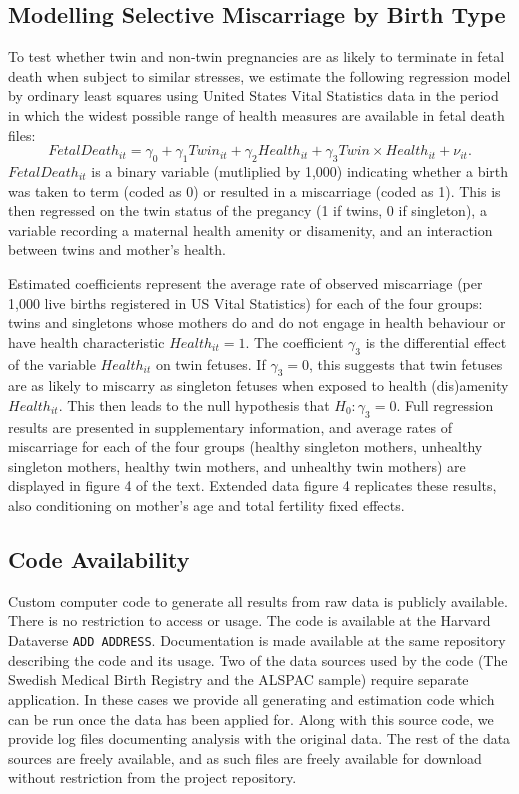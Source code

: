 \documentclass{nature}
\begin{document}
\begin{linenumbers}
\subsection{Modelling Selective Miscarriage by Birth Type}
To test whether twin and non-twin pregnancies are as likely to terminate in fetal death when subject to similar stresses, we estimate the following regression model by ordinary least squares using United States Vital Statistics data in the period in which the widest possible range of health measures are available in fetal death files:
\begin{equation}
FetalDeath_{it} = \gamma_0 + \gamma_1 Twin_{it} + \gamma_2 Health_{it} + \gamma_3 Twin\times Health_{it} + \nu_{it}.
\end{equation}
$FetalDeath_{it}$ is a binary variable (mutliplied by 1,000) indicating whether a birth was taken to term (coded as 0) or resulted in a miscarriage (coded as 1).  This is then regressed on the twin status of the pregancy (1 if twins, 0 if singleton), a variable recording a maternal health amenity or disamenity, and an interaction between twins and mother's health.

Estimated coefficients represent the average rate of observed miscarriage (per 1,000 live births registered in US Vital Statistics) for each of the four groups: twins and singletons whose mothers do and do not engage in health behaviour or have health characteristic $Health_{it}=1$. The coefficient $\gamma_3$ is the differential effect of the variable $Health_{it}$ on twin fetuses.  If $\gamma_3=0$, this suggests that twin fetuses are as likely to miscarry as singleton fetuses when exposed to health (dis)amenity $Health_{it}$.  This then leads to the null hypothesis that $H_0: \gamma_3=0$. Full regression results are presented in supplementary information, and average rates of miscarriage for each of the four groups (healthy singleton mothers, unhealthy singleton mothers, healthy twin mothers, and unhealthy twin mothers) are displayed in figure 4 of the text.  Extended data figure 4 replicates these results, also conditioning on mother's age and total fertility fixed effects.

\subsection{Code Availability}
Custom computer code to generate all results from raw data is publicly available.  There is no restriction to access or usage.  The code is available at the Harvard Dataverse \texttt{ADD ADDRESS}.  Documentation is made available at the same repository describing the code and its usage.  Two of the data sources used by the code (The Swedish Medical Birth Registry and the ALSPAC sample) require separate application.  In these cases we provide all generating and estimation code which can be run once the data has been applied for.  Along with this source code, we provide log files documenting analysis with the original data.  The rest of the data sources are freely available, and as such files are freely available for download without restriction from the project repository.



\end{linenumbers}
\end{document}
